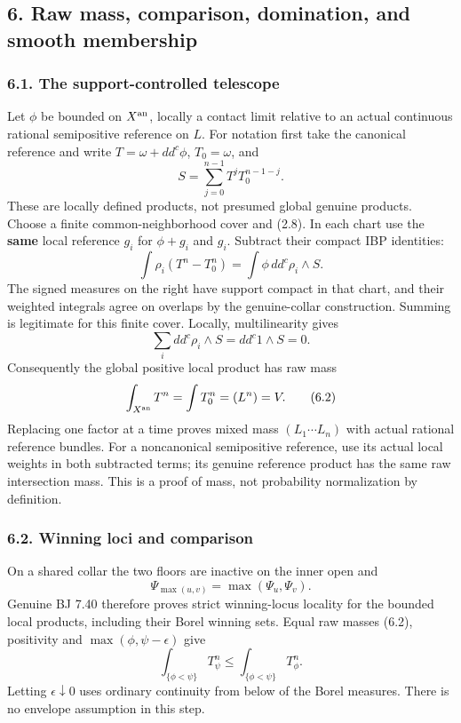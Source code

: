 \documentclass[
  10pt,
]{article}
\begin{document}
\subsection{6. Raw mass, comparison, domination, and smooth
membership}\label{raw-mass-comparison-domination-and-smooth-membership}

\subsubsection{6.1. The support-controlled
telescope}\label{the-support-controlled-telescope}

Let \(\phi\) be bounded on \(X^{\rm an}\), locally a contact limit
relative to an actual continuous rational semipositive reference on
\(L\). For notation first take the canonical reference and write
\(T=\omega+dd^c\phi\), \(T_0=\omega\), and
\[S=\sum_{j=0}^{n-1}T^jT_0^{n-1-j}.\] These are locally defined
products, not presumed global genuine products. Choose a finite
common-neighborhood cover and (2.8). In each chart use the \textbf{same}
local reference \(g_i\) for \(\phi+g_i\) and \(g_i\). Subtract their
compact IBP identities:
\[\int\rho_i(T^n-T_0^n)=\int\phi\,dd^c\rho_i\wedge S. \tag{6.1}\] The
signed measures on the right have support compact in that chart, and
their weighted integrals agree on overlaps by the genuine-collar
construction. Summing is legitimate for this finite cover. Locally,
multilinearity gives \[\sum_i dd^c\rho_i\wedge S=dd^c1\wedge S=0.\]
Consequently the global positive local product has raw mass
\[\int_{X^{\rm an}}T^n=\int T_0^n=(L^n)=V. \tag{6.2}\] Replacing one
factor at a time proves mixed mass \((L_1\cdots L_n)\) with actual
rational reference bundles. For a noncanonical semipositive reference,
use its actual local weights in both subtracted terms; its genuine
reference product has the same raw intersection mass. This is a proof of
mass, not probability normalization by definition.

\subsubsection{6.2. Winning loci and
comparison}\label{winning-loci-and-comparison}

On a shared collar the two floors are inactive on the inner open and
\[\Psi_{\max(u,v)}=\max(\Psi_u,\Psi_v).\] Genuine BJ 7.40 therefore
proves strict winning-locus locality for the bounded local products,
including their Borel winning sets. Equal raw masses (6.2), positivity
and \(\max(\phi,\psi-\epsilon)\) give
\[\int_{\{\phi<\psi\}}T_\psi^n\le\int_{\{\phi<\psi\}}T_\phi^n. \tag{6.3}\]
Letting \(\epsilon\downarrow0\) uses ordinary continuity from below of
the Borel measures. There is no envelope assumption in this step.
\end{document}
